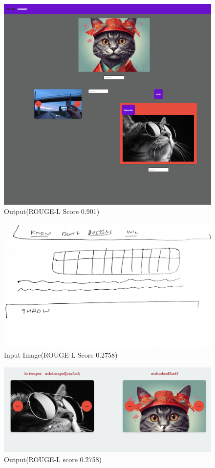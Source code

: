 \begin{figure}[H]
    \includegraphics[scale=.5]{images/m101.png}
    \centering
    \caption{Output(ROUGE-L Score 0.901)}
    \label{fig:m12}
\end{figure}

\begin{figure}[H]
    \centering
    \includegraphics[scale=.1]{images/n1.jpg}
    \caption{Input Image(ROUGE-L Score 0.2758)}
    \label{fig:m13}
\end{figure}

\begin{figure}[H]
    \includegraphics[scale=.35]{images/m1o2.png}
    \caption{Output(ROUGE-L score 0.2758)}
    \label{fig:m14}
\end{figure}





